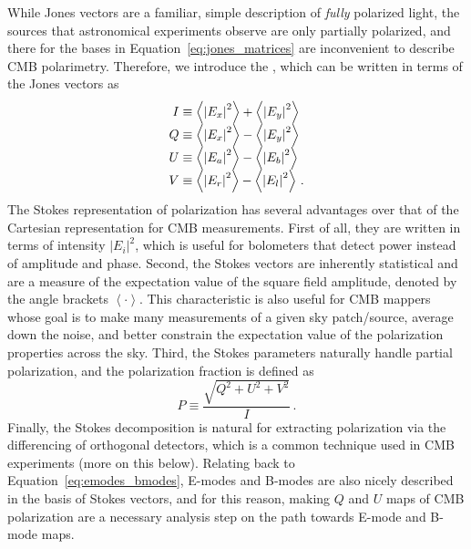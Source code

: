 While Jones vectors are a familiar, simple description of \textit{fully} polarized light, the sources that astronomical experiments observe are only partially polarized, and there for the bases in Equation~\ref{eq:jones_matrices} are inconvenient to describe CMB polarimetry. Therefore, we introduce the , which can be written in terms of the Jones vectors as
\begin{equation}
    \begin{array}{r@{}l}
    I &{}\equiv \left< \left| E_{x} \right|^{2} \right> + \left< \left| E_{y} \right|^{2} \right> \\
    Q &{}\equiv  \left< \left| E_{x} \right|^{2} \right> - \left< \left| E_{y} \right|^{2} \right> \\
    U &{}\equiv  \left< \left| E_{a} \right|^{2} \right> - \left< \left| E_{b} \right|^{2} \right> \\
    V &{}\equiv  \left< \left| E_{r} \right|^{2} \right> - \left< \left| E_{l} \right|^{2} \right> \, .
    \end{array}
    \label{eq:stokes_parameters}
\end{equation}
The Stokes representation of polarization has several advantages over that of the Cartesian representation for CMB measurements. First of all, they are written in terms of intensity $\left| E_{i} \right|^{2}$, which is useful for bolometers that detect power instead of amplitude and phase. Second, the Stokes vectors are inherently statistical and are a measure of the expectation value of the square field amplitude, denoted by the angle brackets $\left< \cdot \right>$. This characteristic is also useful for CMB mappers whose goal is to make many measurements of a given sky patch/source, average down the noise, and better constrain the expectation value of the polarization properties across the sky. Third, the Stokes parameters naturally handle partial polarization, and the polarization fraction is defined as
\begin{equation}
    P \equiv \frac{\sqrt{Q^{2} + U^{2} + V^{2}}}{I} \, .
    \label{eq:stokes_polarization_fraction}
\end{equation}
Finally, the Stokes decomposition is natural for extracting polarization via the differencing of orthogonal detectors, which is a common technique used in CMB experiments (more on this below). Relating back to Equation~\ref{eq:emodes_bmodes}, E-modes and B-modes are also nicely described in the basis of Stokes vectors, and for this reason, making $Q$ and $U$ maps of CMB polarization are a necessary analysis step on the path towards E-mode and B-mode maps.

